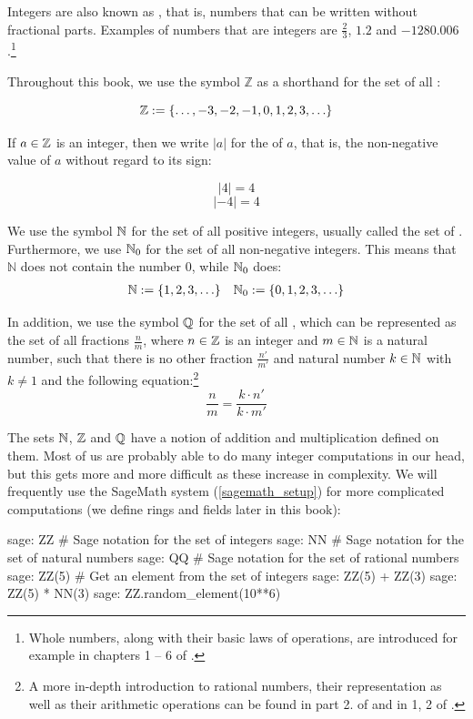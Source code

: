 Integers are also known as , that is, numbers that can be written without fractional parts. Examples of numbers that are  integers are $\frac{2}{3}$, $1.2$ and $-1280.006$.\footnote{Whole numbers, along with their basic laws of operations, are introduced for example in chapters 1 – 6 of \cite{wu-1}.}

Throughout this book, we use the symbol $\mathbb{Z}$ as a shorthand for the set of all :

\begin{equation}
\label{integer_symbol}
\mathbb{Z} := \{\ldots, -3,-2,-1,0,1,2,3,\ldots\}
\end{equation}

If $a\in \mathbb{Z}$ is an integer, then we write $|a|$ for the  of $a$, that is, the non-negative value of $a$ without regard to its sign:

\begin{equation}
|4|= 4
\end{equation}
\begin{equation}
|-4|= 4
\end{equation}

We use the symbol $\mathbb{N}$ for the set of all positive integers, usually called the set of . Furthermore, we use $\mathbb{N}_0$ for the set of all non-negative integers. This means that $\mathbb{N}$ does not contain the number $0$, while $\mathbb{N}_0$ does:
\begin{align*}
\label{natural_symbol}
\mathbb{N} := \{1,2,3,\ldots\} & & \mathbb{N}_0 := \{0,1,2,3,\ldots\}
\end{align*}

In addition, we use the symbol $\mathbb{Q}$ for the set of all , which can be represented as the set of all fractions $\frac{n}{m}$, where $n\in \mathbb{Z}$ is an integer and $m\in \mathbb{N}$ is a natural number, such that there is no other fraction $\frac{n'}{m'}$ and natural number $k\in \mathbb{N}$ with $k\neq 1$ and the following equation:\footnote{A more in-depth introduction to rational numbers, their representation as well as their arithmetic operations can be found in part 2. of \cite{wu-1} and in \chaptname{} 1, \secname{} 2 of \cite{mignotte-1992}.}
\begin{equation}
\frac{n}{m} = \frac{k\cdot n'}{k\cdot m'}
\end{equation}

The sets $\mathbb{N}$, $\mathbb{Z}$ and $\mathbb{Q}$ have a notion of addition and multiplication defined on them. Most of us are probably able to do many integer computations in our head, but this gets more and more difficult as these increase in complexity.  We will frequently use the  SageMath system (\ref{sagemath_setup}) for more complicated computations (we define rings and fields later in this book):
\begin{sagecommandline}
sage: ZZ #  Sage notation for the set of integers
sage: NN # Sage notation for the set of natural numbers
sage: QQ # Sage notation for the set of rational numbers
sage: ZZ(5) # Get an element from the set of integers
sage: ZZ(5) + ZZ(3)
sage: ZZ(5) * NN(3)
sage: ZZ.random_element(10**6)
\end{sagecommandline}

